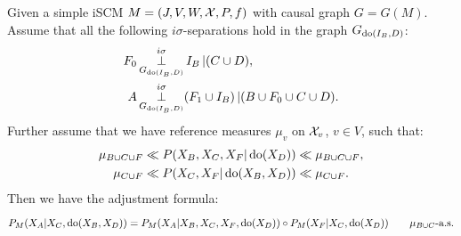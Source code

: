 \begin{Thm}\label{thm:gen-adjustment-scms}
Given a simple iSCM $M = \left ( J, V, W, \mathcal{X}, P, f \right )$ with causal graph $G = G(M)$. %
Assume that all the following $i\sigma$-separations hold in the graph $G_{\operatorname{do}(I_B,D)}$:
    \begin{align}
        F_0 & \operatorname*{\perp}^{i\sigma}_{G_{\operatorname{do}(I_B,D)}} I_B \operatorname*{|} (C \cup D), \\
        A & \operatorname*{\perp}^{i\sigma}_{G_{\operatorname{do}(I_B,D)}} (F_1 \cup I_B) \operatorname*{|} (B \cup F_0 \cup C \cup D).
    \end{align}
Further assume that we have reference measures $\mu_v$ on $\mathcal{X}_v$, $v \in V$, %
such that:
  \begin{align*}
      \mu_{B \cup C \cup F} &\ll  P(X_B,X_C,X_F|\operatorname{do}(X_D)) \ll \mu_{B \cup C \cup F},\\
      \mu_{C \cup F} &\ll  P(X_C,X_F|\operatorname{do}(X_B,X_D)) \ll \mu_{C \cup F}.
  \end{align*}
Then we have the adjustment formula:
\[ P_{M}(X_A|X_C,\operatorname{do}(X_B,X_D)) = P_{M}(X_A|X_B,X_C,X_F,\operatorname{do}(X_D)) \circ P_{M}(X_F|X_C,\operatorname{do}(X_D)) \qquad \mu_{B \cup C}\text{-a.s.} \]
\end{Thm}
